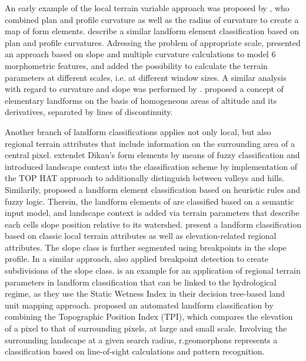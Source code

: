 \documentclass[preprint,12pt,authoryear]{elsarticle}
\begin{document}
An early example of the local terrain variable approach was  proposed by \cite{Dikau1988}, who  combined plan and profile curvature as well as the radius of curvature to create a map of form elements. \cite{Pennock1987} describe a similar landform element classification based on plan and profile curvatures. Adressing the problem of appropriate scale, \cite{Wood1996} presented an approach based on slope and multiple curvature calculations to model 6 morphometric features, and added the possibility to calculate the terrain parameters at different scales, i.e. at different window sizes. A similar analysis with regard to curvature and slope was performed by \cite{Blaszczynski1997}.  \cite{Minar2008} proposed a concept of elementary landforms on the basis of homogeneous areas  of  altitude and its derivatives, separated by lines of discontinuity.  

Another branch of landform classifications applies not only local, but also regional terrain attributes \citep{Gallant2000} that include information on the surrounding area of a central pixel. \cite{Schmidt2004} extendet Dikau's form elements by means of fuzzy classification and  introduced landscape context into the classification scheme by implementation of the TOP HAT approach \citep{Rodriguez2002} to additionally distinguish between valleys and hills.  Similarily, \cite{MacMillan2000a} proposed a landform element classification based on heuristic rules and fuzzy logic. Therein, the landform elements of \cite{Pennock1987} are classified based on a semantic input model, and landscape context is added via terrain parameters that describe each cells slope position relative to its watershed. \cite{Klingseisen2008} present a landform classification based on classic local terrain attributes as well as elevation-related regional attributes. The slope class is further segmented using breakpoints in the slope profile. In a similar approach, \cite{Matsuura2012} also applied breakpoint detection to create subdivisions of the slope class.  \cite{Hollingsworth2006} is an example for an application of regional terrain parameters in landform classification that can be linked to the hydrological regime, as they use the Static Wetness Index in their decision tree-based land unit mapping approach. \cite{Weiss2000} proposed an automated landform classification by combining the Topographic Position Index (TPI), which compares the elevation of a pixel to that of surrounding pixels, at large and small scale. Involving the surrounding landscape at a given search radius, r.geomorphons \citep{Jasiewicz2013} represents a classification based on line-of-sight calculations and pattern recognition.
\end{document}

